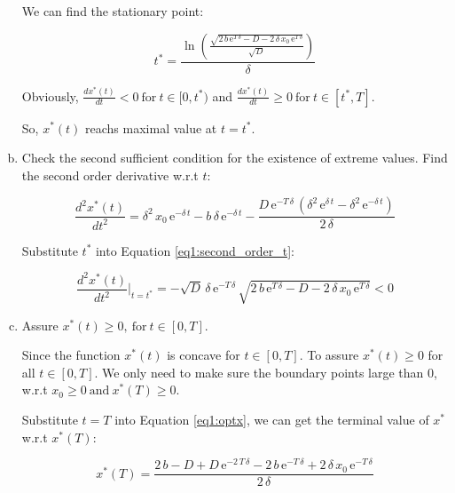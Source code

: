 \documentclass{article}
\begin{document}
\begin{enumerate}[a)]
    We can find the stationary point:

    \begin{equation}\label{eq1:t^*}
        t^*=\frac{\ln\left(\frac{\sqrt{2\,b\,{\mathrm{e}}^{T\,\delta }-D-2\,\delta \,x_{0}\,{\mathrm{e}}^{T\,\delta }}}{\sqrt{D}}\right)}{\delta }
    \end{equation}

    Obviously, $\frac{dx^*(t)}{dt}<0\ \text{for}\ t\in [0,t^*)$ and $\frac{dx^*(t)}{dt}\geq 0\ \text{for}\ t\in [t^*,T]$.
    
    So, $x^*(t)$ reachs maximal value at $t=t^*$.

    \item Check the second sufficient condition for the existence of extreme values. Find the second order derivative w.r.t $t$: 

    \begin{equation}\label{eq1:second_order_t}
        \frac{d^2x^*(t)}{dt^2}=\delta ^2\,x_{0}\,{\mathrm{e}}^{-\delta \,t}-b\,\delta \,{\mathrm{e}}^{-\delta \,t}-\frac{D\,{\mathrm{e}}^{-T\,\delta }\,\left(\delta ^2\,{\mathrm{e}}^{\delta \,t}-\delta ^2\,{\mathrm{e}}^{-\delta \,t}\right)}{2\,\delta }
    \end{equation}

    Substitute $t^*$ into Equation \eqref{eq1:second_order_t}:
    
    \begin{equation}
        \frac{d^2x^*(t)}{dt^2}\bigg|_{t=t^*}=-\sqrt{D}\,\delta \,{\mathrm{e}}^{-T\,\delta }\,\sqrt{2\,b\,{\mathrm{e}}^{T\,\delta }-D-2\,\delta \,x_{0}\,{\mathrm{e}}^{T\,\delta }}<0
    \end{equation}

    \item Assure $x^*(t)\geq 0,\ \text{for}\ t\in[0,T]$.

    Since the function $x^*(t)$ is concave for $t\in[0,T]$. To assure $x^*(t)\geq 0$ for all $t\in [0,T]$. We only need to make sure the boundary points large than $0$, w.r.t $x_0\geq 0\ \text{and}\ x^*(T)\geq 0$.

    Substitute $t=T$ into Equation \eqref{eq1:optx}, we can get the terminal value of $x^*$ w.r.t $x^*(T)$:

    \begin{equation}
        x^*(T)=\frac{2\,b-D+D\,{\mathrm{e}}^{-2\,T\,\delta }-2\,b\,{\mathrm{e}}^{-T\,\delta }+2\,\delta \,x_{0}\,{\mathrm{e}}^{-T\,\delta }}{2\,\delta }
    \end{equation}


\end{enumerate}
\end{document}
